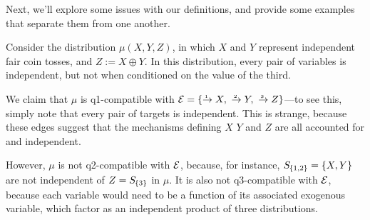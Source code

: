 \documentclass{article}
\begin{document}
Next, we'll explore some issues with our definitions, and provide some examples that separate them from one another.

\begin{example}
    Consider the distribution $\mu(X,Y,Z)$, in which $X$ and $Y$ represent independent fair coin tosses, and $Z := X \oplus Y$.
    In this distribution, every pair of variables is independent, but not when conditioned on the value of the third.

    We claim that $\mu$ is q1-compatible with $\Ed = \{ \ed1{}X, ~ \ed2{}Y, ~ \ed3{}Z \}$---to see this, simply note that every pair of targets is independent. This is strange, because these edges suggest that the mechanisms defining $X$ $Y$ and $Z$ are all accounted for and independent.

    However, $\mu$ is not q2-compatible with $\mathcal E$, because, for instance,
    $\Src {\{1,2\}} = \{X,Y\}$ are not independent of $Z = \Src {\{3\}}$ in $\mu$.
    It is also not q3-compatible with $\mathcal E$, because each variable would need to be a function of its associated exogenous variable, which factor as an independent product of three distributions.
\end{example}
\end{document}
